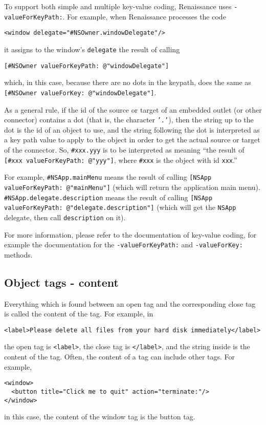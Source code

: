 To support both simple and multiple key-value coding, Renaissance uses
\texttt{-valueForKeyPath:}.  For example, when Renaissance processes the 
code
\begin{verbatim}
<window delegate="#NSOwner.windowDelegate"/>
\end{verbatim}
it assigns to the window's \texttt{delegate} the result of calling
\begin{verbatim}
[#NSOwner valueForKeyPath: @"windowDelegate"]
\end{verbatim}
which, in this case, because there are no dots in the keypath, does
the same as \texttt{[\#NSOwner valueForKey: @"windowDelegate"]}.

As a general rule, if the id of the source or target of an embedded
outlet (or other connector) contains a dot (that is, the character
\texttt{'.'}), then the string up to the dot is the id of an object to
use, and the string following the dot is interpreted as a key path
value to apply to the object in order to get the actual source or
target of the connector.  So, \texttt{\#xxx.yyy} is to be interpreted
as meaning ``the result of \texttt{[\#xxx valueForKeyPath: @"yyy"]},
where \texttt{\#xxx} is the object with id \texttt{xxx}.''

For example, \texttt{\#NSApp.mainMenu} means the result of calling
\texttt{[NSApp valueForKeyPath: @"mainMenu"]} (which will return
the application main menu).  \texttt{\#NSApp.delegate.description}
means the result of calling \texttt{[NSApp valueForKeyPath:
@"delegate.description"]} (which will get the \texttt{NSApp} delegate,
then call \texttt{description} on it).

For more information, please refer to the documentation of key-value
coding, for example the documentation for the
\texttt{-valueForKeyPath:} and \texttt{-valueForKey:} methods.

\subsection{Object tags - content}
Everything which is found between an open tag and the corresponding
close tag is called the content of the tag.  For example, in
\begin{verbatim}
<label>Please delete all files from your hard disk immediately</label>
\end{verbatim}
the open tag is \texttt{<label>}, the close tag is \texttt{</label>},
and the string inside is the content of the tag.  Often, the content
of a tag can include other tags.  For example,
\begin{verbatim}
<window>
  <button title="Click me to quit" action="terminate:"/>
</window>
\end{verbatim}
in this case, the content of the window tag is the button tag.

